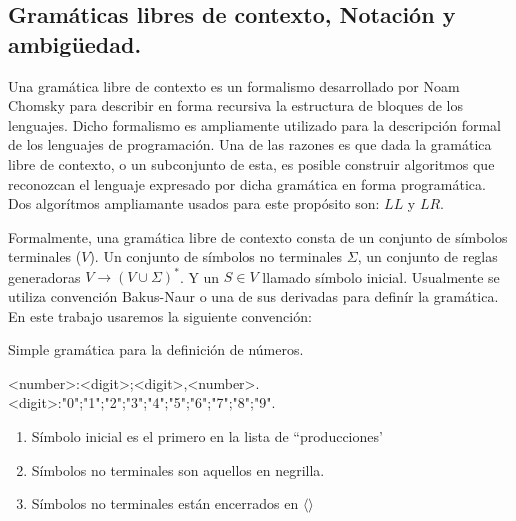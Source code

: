 \subsection{Gramáticas libres de contexto, Notación y ambigüedad.}
Una gramática libre de contexto es un formalismo desarrollado por Noam Chomsky para
describir en forma recursiva la estructura de bloques de los lenguajes. Dicho formalismo
es ampliamente utilizado para la descripción formal de los lenguajes de programación.
Una de las razones es que dada la gramática libre de contexto, o un subconjunto de
esta, es posible construir algoritmos que reconozcan el lenguaje expresado por dicha 
gramática en forma programática. Dos algorítmos ampliamante usados para este
propósito son: $LL$ y $LR$.

Formalmente, una gramática libre de contexto consta de un conjunto de símbolos
terminales ($V$). Un conjunto de símbolos no terminales $\Sigma$, un conjunto de
reglas generadoras $V \rightarrow (V \cup \Sigma)^{*}$. Y un $S \in V$ llamado
símbolo inicial. Usualmente se utiliza convención Bakus-Naur o una de sus derivadas
para definír la gramática. En este trabajo usaremos la siguiente convención:

\begin{ejem}
  Simple gramática para la definición de números.
  \begin{grammar}
    <number>:<digit>;<digit>,<number>.
    <digit>:"0";"1";"2";"3";"4";"5";"6";"7";"8";"9".
  \end{grammar}
\end{ejem}
\begin{enumerate}
\item Símbolo inicial es el primero en la lista de ``producciones'
\item Símbolos no terminales son aquellos en negrilla. 
\item Símbolos no terminales están encerrados en $\langle \rangle$
\end{enumerate}

